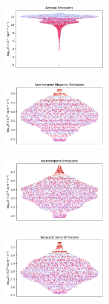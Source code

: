 \begin{figure}[H]
    \centering
    \begin{subfigure}
        \centering
        \includegraphics[width=0.49\textwidth,valign=t]{sosaa-data/figures/trajectories/trajectory-23.05.2018:13.00-aerosols.pdf}
    \end{subfigure}
    \begin{subfigure}
        \centering
        \includegraphics[width=0.49\textwidth,valign=t]{sosaa-data/figures/trajectories/trajectory-23.05.2018:13.00-biogenic.pdf}
    \end{subfigure}
    
    \begin{subfigure}
        \centering
        \includegraphics[width=0.49\textwidth,valign=t]{sosaa-data/figures/trajectories/trajectory-23.05.2018:13.00-monoterpenes.pdf}
    \end{subfigure}
    \begin{subfigure}
        \centering
        \includegraphics[width=0.49\textwidth,valign=t]{sosaa-data/figures/trajectories/trajectory-23.05.2018:13.00-sesquiterpenes.pdf}
    \end{subfigure}


\end{figure}
